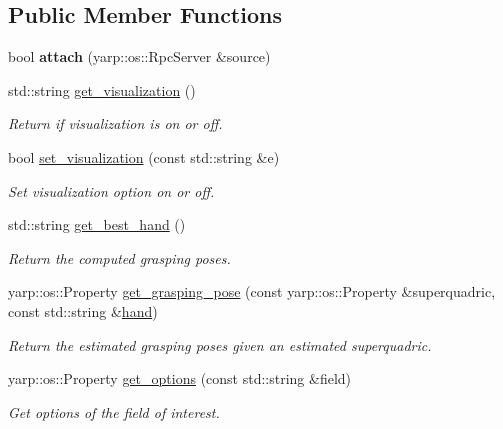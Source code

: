 \subsection*{Public Member Functions}
\begin{DoxyCompactItemize}
\item 
bool {\bfseries attach} (yarp\+::os\+::\+Rpc\+Server \&source)\label{classGraspingModule_ac3e7a265105f99952742a6aca17d67c3}

\item 
std\+::string \hyperlink{classGraspingModule_aabedec650875263d27ecf20fa9dd8b39}{get\+\_\+visualization} ()
\begin{DoxyCompactList}\small\item\em Return if visualization is on or off. \end{DoxyCompactList}\item 
bool \hyperlink{classGraspingModule_a801de4b63aba360a4b85e322c5947a4a}{set\+\_\+visualization} (const std\+::string \&e)
\begin{DoxyCompactList}\small\item\em Set visualization option on or off. \end{DoxyCompactList}\item 
std\+::string \hyperlink{classGraspingModule_a5103f8bd6671a11a9bd1c7e29d290009}{get\+\_\+best\+\_\+hand} ()
\begin{DoxyCompactList}\small\item\em Return the computed grasping poses. \end{DoxyCompactList}\item 
yarp\+::os\+::\+Property \hyperlink{classGraspingModule_af1e057f767ab83be185cf486d3f5c46b}{get\+\_\+grasping\+\_\+pose} (const yarp\+::os\+::\+Property \&superquadric, const std\+::string \&\hyperlink{classGraspingModule_af8308a8938957b4bb50c260dc42d7b27}{hand})
\begin{DoxyCompactList}\small\item\em Return the estimated grasping poses given an estimated superquadric. \end{DoxyCompactList}\item 
yarp\+::os\+::\+Property \hyperlink{classGraspingModule_a375475691c644d8aa882db8d65ceda50}{get\+\_\+options} (const std\+::string \&field)
\begin{DoxyCompactList}\small\item\em Get options of the field of interest. \end{DoxyCompactList}\item 

\end{DoxyCompactItemize}
